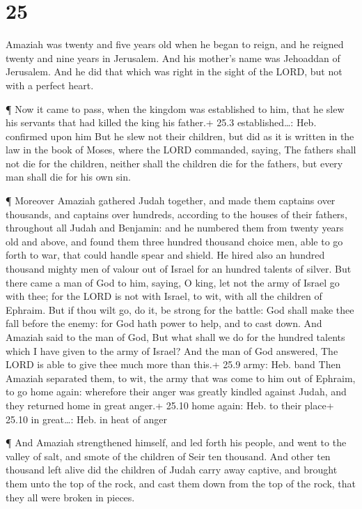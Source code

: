 \hypertarget{section-24}{%
\section{25}\label{section-24}}

 Amaziah was twenty and five years old when he began to
reign, and he reigned twenty and nine years in Jerusalem. And his
mother's name was Jehoaddan of Jerusalem.  And he did that
which was right in the sight of the LORD, but not with a perfect heart.

 ¶ Now it came to pass, when the kingdom was established to
him, that he slew his servants that had killed the king his father.+
25.3 established\ldots: Heb. confirmed upon him  But he slew
not their children, but did as it is written in the law in the book of
Moses, where the LORD commanded, saying, The fathers shall not die for
the children, neither shall the children die for the fathers, but every
man shall die for his own sin.

 ¶ Moreover Amaziah gathered Judah together, and made them
captains over thousands, and captains over hundreds, according to the
houses of their fathers, throughout all Judah and Benjamin: and he
numbered them from twenty years old and above, and found them three
hundred thousand choice men, able to go forth to war, that could handle
spear and shield.  He hired also an hundred thousand mighty
men of valour out of Israel for an hundred talents of silver.
 But there came a man of God to him, saying, O king, let not
the army of Israel go with thee; for the LORD is not with Israel, to
wit, with all the children of Ephraim.  But if thou wilt go,
do it, be strong for the battle: God shall make thee fall before the
enemy: for God hath power to help, and to cast down.  And
Amaziah said to the man of God, But what shall we do for the hundred
talents which I have given to the army of Israel? And the man of God
answered, The LORD is able to give thee much more than this.+ 25.9 army:
Heb. band  Then Amaziah separated them, to wit, the army
that was come to him out of Ephraim, to go home again: wherefore their
anger was greatly kindled against Judah, and they returned home in great
anger.+ 25.10 home again: Heb. to their place+ 25.10 in great\ldots:
Heb. in heat of anger

 ¶ And Amaziah strengthened himself, and led forth his
people, and went to the valley of salt, and smote of the children of
Seir ten thousand.  And other ten thousand left alive did
the children of Judah carry away captive, and brought them unto the top
of the rock, and cast them down from the top of the rock, that they all
were broken in pieces.

